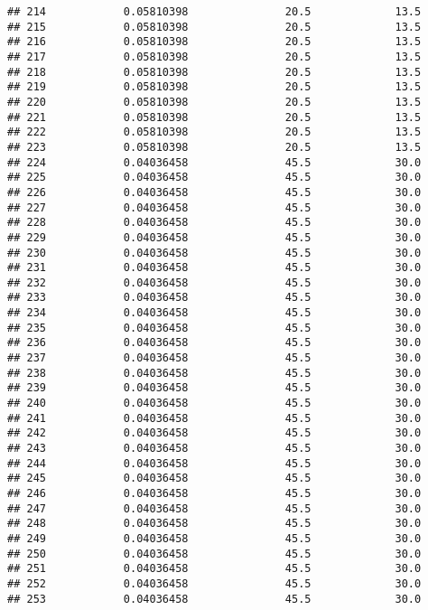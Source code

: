 \documentclass[]{article}
\begin{document}
\begin{verbatim}
## 214            0.05810398               20.5             13.5
## 215            0.05810398               20.5             13.5
## 216            0.05810398               20.5             13.5
## 217            0.05810398               20.5             13.5
## 218            0.05810398               20.5             13.5
## 219            0.05810398               20.5             13.5
## 220            0.05810398               20.5             13.5
## 221            0.05810398               20.5             13.5
## 222            0.05810398               20.5             13.5
## 223            0.05810398               20.5             13.5
## 224            0.04036458               45.5             30.0
## 225            0.04036458               45.5             30.0
## 226            0.04036458               45.5             30.0
## 227            0.04036458               45.5             30.0
## 228            0.04036458               45.5             30.0
## 229            0.04036458               45.5             30.0
## 230            0.04036458               45.5             30.0
## 231            0.04036458               45.5             30.0
## 232            0.04036458               45.5             30.0
## 233            0.04036458               45.5             30.0
## 234            0.04036458               45.5             30.0
## 235            0.04036458               45.5             30.0
## 236            0.04036458               45.5             30.0
## 237            0.04036458               45.5             30.0
## 238            0.04036458               45.5             30.0
## 239            0.04036458               45.5             30.0
## 240            0.04036458               45.5             30.0
## 241            0.04036458               45.5             30.0
## 242            0.04036458               45.5             30.0
## 243            0.04036458               45.5             30.0
## 244            0.04036458               45.5             30.0
## 245            0.04036458               45.5             30.0
## 246            0.04036458               45.5             30.0
## 247            0.04036458               45.5             30.0
## 248            0.04036458               45.5             30.0
## 249            0.04036458               45.5             30.0
## 250            0.04036458               45.5             30.0
## 251            0.04036458               45.5             30.0
## 252            0.04036458               45.5             30.0
## 253            0.04036458               45.5             30.0

\end{verbatim}
\end{document}
